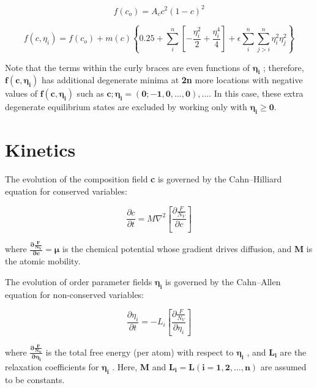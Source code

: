 
\begin{equation}
f(c_o)=A_c c^2(1-c)^2
\end{equation}

\begin{equation}
f(c,\eta_i)=f(c_o)+m(c)\left\{  0.25+\sum_i^n \left[- \frac{\eta_i^2}{2}+ \frac{\eta_i^4}{4}\right] + \epsilon\sum_i^n\sum_{j>i}^n \eta_i^2\eta_j^2 \right\}
\end{equation}


Note that the terms within the curly braces are even functions of $\mathbold{\eta_{i}}$ ; therefore, $\mathbold{f(c,\eta_{i})}$ has additional degenerate minima at \textbf{2n} more locations with negative values of $\mathbold{f(c,\eta_{i})}$ such as $\mathbold{{c ;\eta_{i}} = (0;-1,0,...,0),...}$. In this case, these extra degenerate equilibrium states are excluded by working only with $\mathbold{\eta_{i}\geq 0}$.

\section{Kinetics}
The evolution of the composition field \textbf{c} is governed by the Cahn–Hilliard equation for conserved variables:


\begin{equation}
\frac{\partial c}{\partial t}=M\nabla^2\left[\frac{\partial \frac{F}{N_V}}{\partial c}\right]
\end{equation}

where $\mathbold{\frac{\partial \frac{F}{N_V}}{\partial c}=\mu}$ is the chemical potential whose gradient drives diffusion, and \textbf{M} is the atomic mobility.

The evolution of order parameter fields $\mathbold{\eta_{i}}$ is governed by the Cahn–Allen equation for non-conserved variables:

\begin{equation}
\frac{\partial \eta_i}{\partial t}=-L_i\left[\frac{\partial \frac{F}{N_V}}{\partial \eta_i}\right]
\end{equation}

where $\mathbold{\frac{\partial \frac{F}{N_V}}{\partial \eta_i}}$ is the total free energy (per atom) with respect to $\mathbold{\eta_{i}}$ , and $\mathbold{L_{i}}$ are the relaxation coefficients for $\mathbold{\eta_{i}}$ . Here, \textbf{M} and $\mathbold{L_i= L (i = 1,2,...,n)}$ are assumed to be constants.

